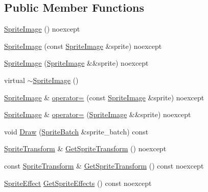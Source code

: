 \subsection*{Public Member Functions}
\begin{DoxyCompactItemize}
\item 
\hyperlink{classmage_1_1rendering_1_1_sprite_image_af49f06e0de889dbfd2db264d9e07fc20}{Sprite\+Image} () noexcept
\item 
\hyperlink{classmage_1_1rendering_1_1_sprite_image_a788c62105830b6986a686c6f249c825d}{Sprite\+Image} (const \hyperlink{classmage_1_1rendering_1_1_sprite_image}{Sprite\+Image} \&sprite) noexcept
\item 
\hyperlink{classmage_1_1rendering_1_1_sprite_image_a267b1f56243e020f8cabef5d09c63cae}{Sprite\+Image} (\hyperlink{classmage_1_1rendering_1_1_sprite_image}{Sprite\+Image} \&\&sprite) noexcept
\item 
virtual \hyperlink{classmage_1_1rendering_1_1_sprite_image_a8723b0d72d07773eb4be1c059c7c1fb9}{$\sim$\+Sprite\+Image} ()
\item 
\hyperlink{classmage_1_1rendering_1_1_sprite_image}{Sprite\+Image} \& \hyperlink{classmage_1_1rendering_1_1_sprite_image_acf6e19eaf380ea76e4361778693facf2}{operator=} (const \hyperlink{classmage_1_1rendering_1_1_sprite_image}{Sprite\+Image} \&sprite) noexcept
\item 
\hyperlink{classmage_1_1rendering_1_1_sprite_image}{Sprite\+Image} \& \hyperlink{classmage_1_1rendering_1_1_sprite_image_adabb87110ec41d770061d375cb0db000}{operator=} (\hyperlink{classmage_1_1rendering_1_1_sprite_image}{Sprite\+Image} \&\&sprite) noexcept
\item 
void \hyperlink{classmage_1_1rendering_1_1_sprite_image_a0e4e572bae31d431f670895f98a7895e}{Draw} (\hyperlink{classmage_1_1rendering_1_1_sprite_batch}{Sprite\+Batch} \&sprite\+\_\+batch) const
\item 
\hyperlink{classmage_1_1_sprite_transform}{Sprite\+Transform} \& \hyperlink{classmage_1_1rendering_1_1_sprite_image_a1f4b344e6c2087c7b68b65a8d719e5ef}{Get\+Sprite\+Transform} () noexcept
\item 
const \hyperlink{classmage_1_1_sprite_transform}{Sprite\+Transform} \& \hyperlink{classmage_1_1rendering_1_1_sprite_image_a4d2fdf5ac9f60ef9bceb54055080a20b}{Get\+Sprite\+Transform} () const noexcept
\item 
\hyperlink{namespacemage_1_1rendering_a4dbc3536c87b906f1d41d863ec458e78}{Sprite\+Effect} \hyperlink{classmage_1_1rendering_1_1_sprite_image_a82a804fe9ed8c685268a1a42ab853eb4}{Get\+Sprite\+Effects} () const noexcept

\end{DoxyCompactItemize}
